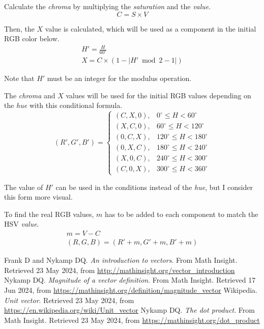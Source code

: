 \documentclass{amsart}
\begin{document}
Calculate the \textit{chroma} by multiplying the \textit{saturation} and the
\textit{value}.
\begin{displaymath}
  C = S \times V
\end{displaymath}

Then, the $X$ value is calculated, which will be used as a component in the
initial RGB color below.
\begin{gather*}
  H' = \frac{H}{60^\circ} \\
  X = C \times \left( 1 - \left| H' \bmod 2 - 1 \right| \right)
\end{gather*}

Note that $H'$ must be an integer for the modulus operation.

The \textit{chroma} and $X$ values will be used for the initial RGB values
depending on the \textit{hue} with this conditional formula.
\begin{displaymath}
  \left( R', G', B' \right) =
  \begin{cases}
    (C, X, 0), & 0^\circ \leq H < 60^\circ \\
    (X, C, 0), & 60^\circ \leq H < 120^\circ \\
    (0, C, X), & 120^\circ \leq H < 180^\circ \\
    (0, X, C), & 180^\circ \leq H < 240^\circ \\
    (X, 0, C), & 240^\circ \leq H < 300^\circ \\
    (C, 0, X), & 300^\circ \leq H < 360^\circ
  \end{cases}
\end{displaymath}

The value of $H'$ can be used in the conditions instead of the \textit{hue}, but
I consider this form more visual.

To find the real RGB values, $m$ has to be added to each component to match the
HSV \textit{value}.
\begin{gather*}
  m = V - C \\
  (R, G, B) = (R' + m, G' + m, B' + m)
\end{gather*}


\newpage
\begin{thebibliography}{9}
  Frank D and Nykamp DQ. \textit{An introduction to vectors}. From Math
  Insight. Retrieved 23 May 2024, from
  \url{http://mathinsight.org/vector_introduction}
  Nykamp DQ. \textit{Magnitude of a vector definition}. From Math
  Insight. Retrieved 17 Jun 2024, from
  \url{https://mathinsight.org/definition/magnitude_vector}
  Wikipedia. \textit{Unit vector}. Retrieved 23 May 2024, from
  \url{https://en.wikipedia.org/wiki/Unit_vector}
  Nykamp DQ. \textit{The dot product}. From Math Insight. Retrieved 23 May 2024,
  from \url{https://mathinsight.org/dot_product}
\end{thebibliography}
\end{document}
